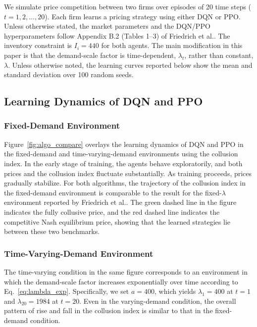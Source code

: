 \documentclass[runningheads]{llncs}
\begin{document}
We simulate price competition between two firms over episodes of 20 time steps ($t=1, 2, \ldots, 20$).
Each firm learns a pricing strategy using either DQN or PPO.
Unless otherwise stated, the market parameters and the DQN/PPO hyperparameters follow Appendix B.2 (Tables 1--3) of Friedrich et al.\cite{friedrich2025learning}.
The inventory constraint is $I_i=440$ for both agents.
The main modification in this paper is that the demand-scale factor is time-dependent, $\lambda_t$, rather than constant, $\lambda$.
Unless otherwise noted, the learning curves reported below show the mean and standard deviation over 100 random seeds.

\subsection{Learning Dynamics of DQN and PPO}

\subsubsection{Fixed-Demand Environment}

Figure~\ref{fig:algo_compare} overlays the learning dynamics of DQN and PPO in the fixed-demand and time-varying-demand environments using the collusion index.
In the early stage of training, the agents behave exploratorily, and both prices and the collusion index fluctuate substantially.
As training proceeds, prices gradually stabilize.
For both algorithms, the trajectory of the collusion index in the fixed-demand environment is comparable to the result for the fixed-$\lambda$ environment reported by Friedrich et al.\cite{friedrich2025learning}.
The green dashed line in the figure indicates the fully collusive price, and the red dashed line indicates the competitive Nash equilibrium price, showing that the learned strategies lie between these two benchmarks.

\subsubsection{Time-Varying-Demand Environment}

The time-varying condition in the same figure corresponds to an environment in which the demand-scale factor increases exponentially over time according to Eq.~\eqref{eq:lambda_exp}.
Specifically, we set $a=400$, which yields $\lambda_1=400$ at $t=1$ and $\lambda_{20}=1984$ at $t=20$.
Even in the varying-demand condition, the overall pattern of rise and fall in the collusion index is similar to that in the fixed-demand condition.
\end{document}
